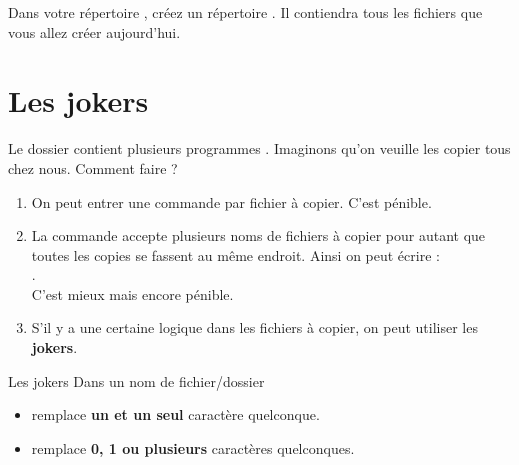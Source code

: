\documentclass[a4paper,11pt]{style-esi/td}
\begin{document}
\entete
\titre
{}
\lastedit

\bigskip
\tableofcontents

\vfill
\begin{infobox}
    Dans votre répertoire , 
	créez un répertoire . 
    Il contiendra tous les fichiers que vous allez créer aujourd'hui. 
\end{infobox}
\vfill

\newpage

\section{Les jokers}

	Le dossier  contient plusieurs programmes .
	Imaginons qu'on veuille les copier tous chez nous. Comment faire ?
	\begin{enumerate}
	\item 
		On peut entrer une commande  par fichier à copier.
		C'est pénible.
	\item 
		La commande  accepte plusieurs noms de fichiers à copier
		pour autant que toutes les copies se fassent au même endroit.
		Ainsi on peut écrire : 
		\\.
		\\C'est mieux mais encore pénible.
	\item
		S'il y a une certaine logique dans les fichiers à copier,
		on peut utiliser les \textbf{jokers}.
	\end{enumerate}

	\begin{theorie}{Les jokers}
		Dans un nom de fichier/dossier
		\begin{itemize}
			\item \og{}\fg{} remplace \textbf{un et un seul} caractère quelconque.
			\item \og{}\samp{*}\fg{} remplace \textbf{0, 1 ou plusieurs} caractères quelconques.
		\end{itemize}
	\end{theorie}
\end{document}
